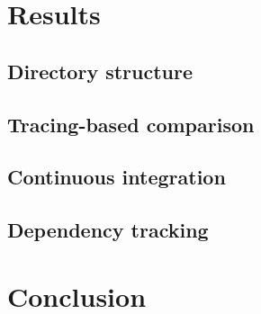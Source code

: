 \documentclass{beamer}
\begin{document}
\section{Results}
\begin{frame}\frametitle{\secname}
\end{frame}

\subsection{Directory structure}
\begin{frame}\frametitle{\subsecname}
\end{frame}

\subsection{Tracing-based comparison}
\begin{frame}\frametitle{\subsecname}
\end{frame}

\subsection{Continuous integration}
\begin{frame}\frametitle{\subsecname}
\end{frame}

\subsection{Dependency tracking}
\begin{frame}\frametitle{\subsecname}
\end{frame}

\section{Conclusion}


\end{document}
